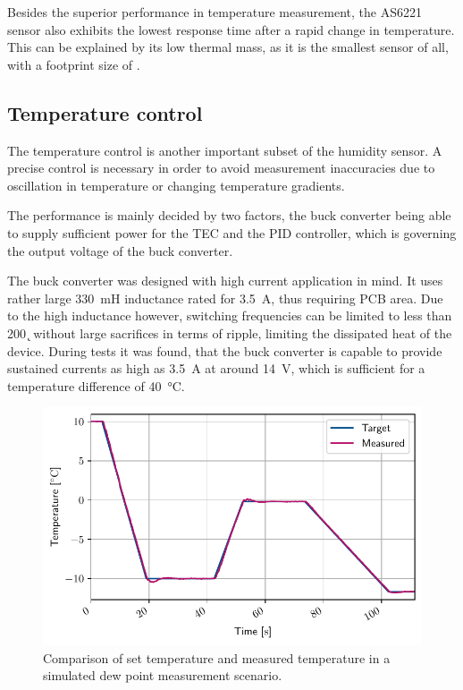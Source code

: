 Besides the superior performance in temperature measurement, the AS6221 sensor also exhibits the lowest response time after a rapid change in temperature. This can be explained by its low thermal mass, as it is the smallest sensor of all, with a footprint size of .


\subsection{Temperature control}
The temperature control is another important subset of the humidity sensor. A precise control is necessary in order to avoid measurement inaccuracies due to oscillation in temperature or changing temperature gradients.

The performance is mainly decided by two factors, the buck converter being able to supply sufficient power for the \gls{TEC} and the \gls{PID} controller, which is governing the output voltage of the buck converter.

The buck converter was designed with high current application in mind. It uses rather large \qty{330}{\milli\henry} inductance rated for \qty{3.5}{\ampere}, thus requiring  \gls{PCB} area. Due to the high inductance however, switching frequencies can be limited to less than \qty{200}{\k\Hz} without large sacrifices in terms of ripple, limiting the dissipated heat of the device. During tests it was found, that the buck converter is capable to provide sustained currents as high as \qty{3.5}{\A} at around \qty{14}{\V}, which is sufficient for a temperature difference of \qty{40}{\celsius}.

\begin{figure}[!b]
    \centering
    \includegraphics{graphs/pid_offset.pdf}
    \caption{Comparison of set temperature and measured temperature in a simulated dew point measurement scenario.}
    \label{g:pid}
\end{figure}

